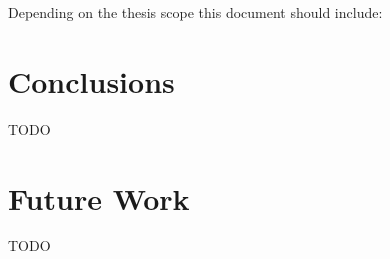 \documentclass[a4paper,12pt]{article}
\begin{document}
{Depending on the thesis scope this document should include:}

%

\clearpage
\section{Conclusions}
\label{sec:conclusions}

TODO

\section{Future Work}
\label{sec:futwork}

TODO

\newpage

\medskip




\clearpage
\newpage
\begin{appendices}



\end{appendices}

\cleardoublepage
{}
{}
\printacronyms[include=abbrev,name=Glossary]
\end{document}
